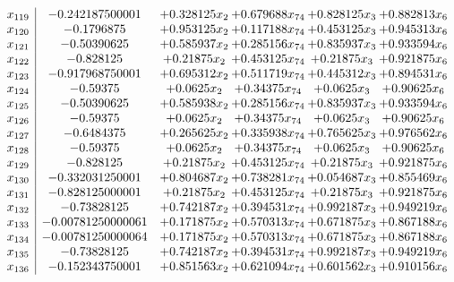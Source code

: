 \documentclass[11pt]{article}
\begin{document}
\[\begin{array}{c| c c@{\hskip 2pt} c@{\hskip 2pt} c@{\hskip 2pt} c@{\hskip 2pt} }
 x_{119}   &  -0.242187500001 & + 0.328125 x_{2} & + 0.679688 x_{74} & + 0.828125 x_{3} & + 0.882813 x_{6}\\
 x_{120}   &  -0.1796875 & + 0.953125 x_{2} & + 0.117188 x_{74} & + 0.453125 x_{3} & + 0.945313 x_{6}\\
 x_{121}   &  -0.50390625 & + 0.585937 x_{2} & + 0.285156 x_{74} & + 0.835937 x_{3} & + 0.933594 x_{6}\\
 x_{122}   &  -0.828125 & + 0.21875 x_{2} & + 0.453125 x_{74} & + 0.21875 x_{3} & + 0.921875 x_{6}\\
 x_{123}   &  -0.917968750001 & + 0.695312 x_{2} & + 0.511719 x_{74} & + 0.445312 x_{3} & + 0.894531 x_{6}\\
 x_{124}   &  -0.59375 & + 0.0625 x_{2} & + 0.34375 x_{74} & + 0.0625 x_{3} & + 0.90625 x_{6}\\
 x_{125}   &  -0.50390625 & + 0.585938 x_{2} & + 0.285156 x_{74} & + 0.835937 x_{3} & + 0.933594 x_{6}\\
 x_{126}   &  -0.59375 & + 0.0625 x_{2} & + 0.34375 x_{74} & + 0.0625 x_{3} & + 0.90625 x_{6}\\
 x_{127}   &  -0.6484375 & + 0.265625 x_{2} & + 0.335938 x_{74} & + 0.765625 x_{3} & + 0.976562 x_{6}\\
 x_{128}   &  -0.59375 & + 0.0625 x_{2} & + 0.34375 x_{74} & + 0.0625 x_{3} & + 0.90625 x_{6}\\
 x_{129}   &  -0.828125 & + 0.21875 x_{2} & + 0.453125 x_{74} & + 0.21875 x_{3} & + 0.921875 x_{6}\\
 x_{130}   &  -0.332031250001 & + 0.804687 x_{2} & + 0.738281 x_{74} & + 0.054687 x_{3} & + 0.855469 x_{6}\\
 x_{131}   &  -0.828125000001 & + 0.21875 x_{2} & + 0.453125 x_{74} & + 0.21875 x_{3} & + 0.921875 x_{6}\\
 x_{132}   &  -0.73828125 & + 0.742187 x_{2} & + 0.394531 x_{74} & + 0.992187 x_{3} & + 0.949219 x_{6}\\
 x_{133}   &  -0.00781250000061 & + 0.171875 x_{2} & + 0.570313 x_{74} & + 0.671875 x_{3} & + 0.867188 x_{6}\\
 x_{134}   &  -0.00781250000064 & + 0.171875 x_{2} & + 0.570313 x_{74} & + 0.671875 x_{3} & + 0.867188 x_{6}\\
 x_{135}   &  -0.73828125 & + 0.742187 x_{2} & + 0.394531 x_{74} & + 0.992187 x_{3} & + 0.949219 x_{6}\\
 x_{136}   &  -0.152343750001 & + 0.851563 x_{2} & + 0.621094 x_{74} & + 0.601562 x_{3} & + 0.910156 x_{6}\\

\end{array}\]
\end{document}
